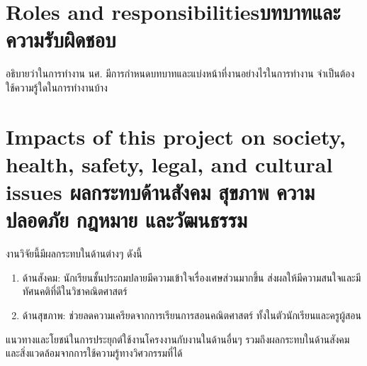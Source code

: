 \section{\ifenglish Roles and responsibilities\else บทบาทและความรับผิดชอบ\fi}
อธิบายว่าในการทำงาน นศ. มีการกำหนดบทบาทและแบ่งหน้าที่งานอย่างไรในการทำงาน จำเป็นต้องใช้ความรู้ใดในการทำงานบ้าง

\section{\ifenglish%
Impacts of this project on society, health, safety, legal, and cultural issues
\else%
ผลกระทบด้านสังคม สุขภาพ ความปลอดภัย กฎหมาย และวัฒนธรรม
\fi}
งานวิจัยนี้มีผลกระทบในด้านต่างๆ ดังนี้
\begin{enumerate}
    \item ด้านสังคม: นักเรียนชั้นประถมปลายมีความเข้าใจเรื่องเศษส่วนมากขึ้น ส่งผลให้มีความสนใจและมีทัศนคติที่ดีในวิชาคณิตศาสตร์
    \item ด้านสุขภาพ: ช่วยลดความเครียดจากการเรียนการสอนคณิตศาสตร์ ทั้งในตัวนักเรียนและครูผู้สอน
\end{enumerate}

แนวทางและโยชน์ในการประยุกต์ใช้งานโครงงานกับงานในด้านอื่นๆ รวมถึงผลกระทบในด้านสังคมและสิ่งแวดล้อมจากการใช้ความรู้ทางวิศวกรรมที่ได้
